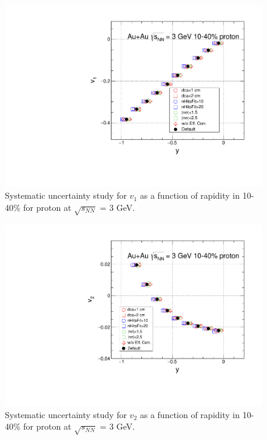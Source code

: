 \begin{figure}[h]
\includegraphics[scale=0.5]{FXT3gev/chapter3/fig/sys/proton/v1y_proton_sys.pdf}
\caption{Systematic uncertainty study for $v_{1}$ as a function of rapidity in 10-40\% for proton at $\sqrt{s_{NN}}$ = 3 GeV. }
\label{fig:proton_v1y_sys}
\end{figure}

\begin{figure}[h]
\includegraphics[scale=0.5]{FXT3gev/chapter3/fig/sys/proton/v2y_proton_sys.pdf}
\caption{Systematic uncertainty study for $v_{2}$ as a function of rapidity in 10-40\% for proton at $\sqrt{s_{NN}}$ = 3 GeV. }
\label{fig:proton_v2y_sys}
\end{figure}

